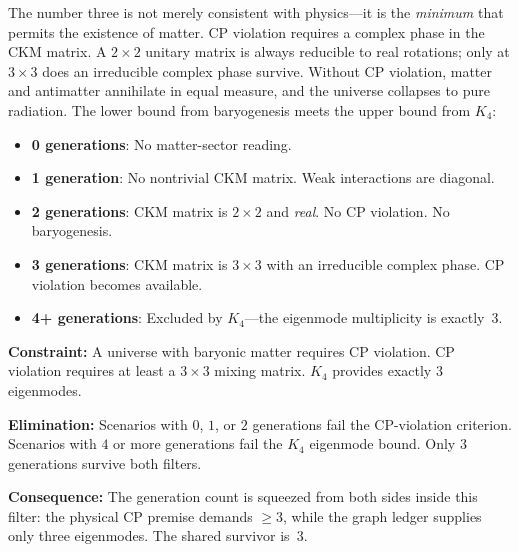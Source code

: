 \documentclass[11pt,a4paper]{book}
\begin{document}
The number three is not merely consistent with physics---it is the
\emph{minimum} that permits the existence of matter.  CP violation
requires a complex phase in the CKM matrix.  A $2 \times 2$ unitary
matrix is always reducible to real rotations; only at $3 \times 3$ does
an irreducible complex phase survive.  Without CP violation, matter and
antimatter annihilate in equal measure, and the universe collapses to
pure radiation.  The lower bound from baryogenesis meets the upper bound
from $K_4$:

\begin{itemize}
\item \textbf{0 generations}: No matter-sector reading.
\item \textbf{1 generation}: No nontrivial CKM matrix.  Weak interactions are diagonal.
\item \textbf{2 generations}: CKM matrix is $2 \times 2$ and \emph{real}.
      No CP violation.  No baryogenesis.
\item \textbf{3 generations}: CKM matrix is $3 \times 3$ with an
  irreducible complex phase.  CP violation becomes available.
\item \textbf{4+ generations}: Excluded by $K_4$---the eigenmode
      multiplicity is exactly~$3$.
\end{itemize}

\textbf{Constraint:}
A universe with baryonic matter requires CP violation.  CP violation
requires at least a $3 \times 3$ mixing matrix.  $K_4$ provides
exactly $3$ eigenmodes.

\textbf{Elimination:}
Scenarios with $0$, $1$, or $2$ generations fail the CP-violation
criterion.  Scenarios with $4$ or more generations fail the $K_4$
eigenmode bound.  Only $3$ generations survive both filters.

\textbf{Consequence:}
The generation count is squeezed from both sides inside this filter: the
physical CP premise demands $\geq 3$, while the graph ledger supplies only
three eigenmodes.  The shared survivor is~$3$.
\end{document}
